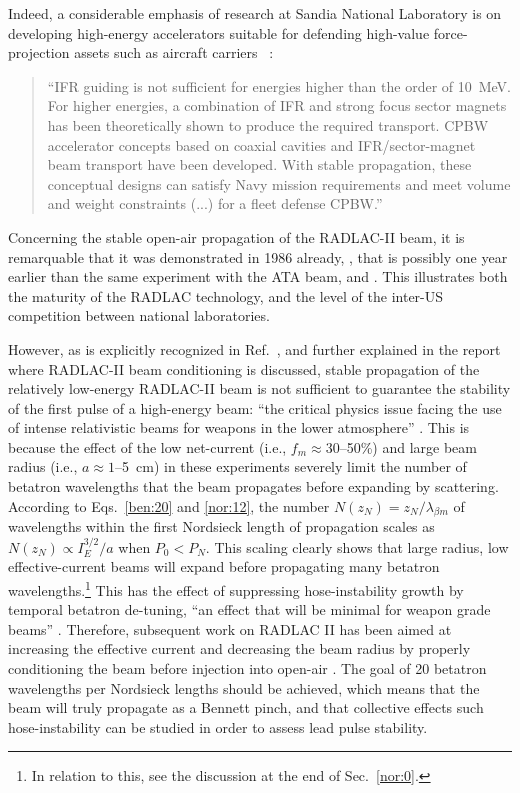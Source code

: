\documentclass [12pt,a4paper,     ]{report} %
\begin{document}
\noindent Indeed, a considerable emphasis of research at Sandia National Laboratory is on developing high-energy accelerators suitable for defending high-value force-projection assets such as aircraft carriers \cite[p.5]{HASTI1986-}~:

\begin{quote}
``IFR guiding is not sufficient for energies higher than the order of 10~MeV. For higher energies, a combination of IFR and strong focus sector magnets has been theoretically shown to produce the required transport. CPBW accelerator concepts based on coaxial cavities and IFR/sector-magnet beam transport have been developed.  With stable propagation, these conceptual designs can satisfy Navy mission requirements and meet volume and weight constraints (...) for a fleet defense CPBW.''
\end{quote}

   Concerning the stable open-air propagation of the RADLAC-II beam, it is remarquable that it was demonstrated in 1986 already, \cite{MAZAR1986-}, that is possibly one year earlier than the same experiment with the ATA beam, \cite[p.3]{LLNL1987A} and \cite[p.54]{LLNL1987B}.  This illustrates both the maturity of the RADLAC technology, and the level of the inter-US competition between national laboratories.

    However, as is explicitly recognized in Ref.~\cite{HASTI1986-}, and further explained in the report~\cite{EKDAH1986-} where RADLAC-II beam conditioning is discussed, stable propagation of the relatively low-energy RADLAC-II beam is not sufficient to guarantee the stability of the first pulse of a high-energy beam: ``the critical physics issue facing the use of intense relativistic beams for weapons in the lower atmosphere'' \cite[p.1]{EKDAH1986-}.  This is because the effect of the low net-current (i.e., $f_m \approx 30$--50\%) and large beam radius (i.e., $a \approx 1$--5~cm) in these experiments severely limit the number of betatron wavelengths that the beam propagates before expanding by scattering.  According to Eqs.~\eqref{ben:20} and \eqref{nor:12},  the number $N(z_N) = z_N/\lambda_{\beta m}$ of wavelengths within the first Nordsieck length of propagation scales as $N(z_N) \propto I_E^{3/2}/a$ when $P_0 < P_N$. This scaling clearly shows that large radius, low effective-current beams will expand before propagating many betatron wavelengths.\footnote{In relation to this, see the discussion at the end of Sec.~\ref{nor:0}.}  This has the effect of suppressing hose-instability growth by temporal betatron de-tuning, ``an effect that will be minimal for weapon grade beams'' \cite[p.1]{EKDAH1986-}.  Therefore, subsequent work on RADLAC II has been aimed at increasing the effective current and decreasing the beam radius by properly conditioning the beam before injection into open-air \cite{EKDAH1986-}. The goal of 20 betatron wavelengths per Nordsieck lengths should be achieved, which means that the beam will truly propagate as a Bennett pinch, and that collective effects such hose-instability can be studied in order to assess lead pulse stability.
\end{document}
